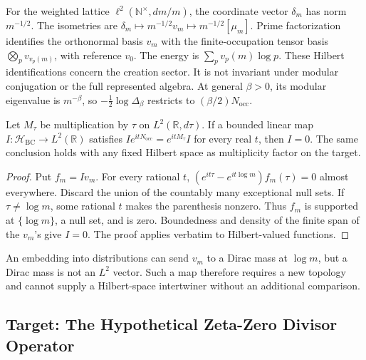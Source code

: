 \begin{remark}
\label{v4-arith:w9-r4:rem:bc-structure}
For the weighted lattice \(\ell^2(\mathbb N^\times,dm/m)\), the
coordinate vector \(\delta_m\) has norm \(m^{-1/2}\). The isometries are
\(\delta_m\mapsto m^{-1/2}v_m\mapsto m^{-1/2}[\mu_m]\).
Prime factorization identifies the orthonormal basis \(v_m\) with the
finite-occupation tensor basis \(\bigotimes_p v_{v_p(m)}\), with
reference \(v_0\). The energy is \(\sum_p v_p(m)\log p\).
These Hilbert identifications concern the creation sector. It is not
invariant under modular conjugation or the full represented algebra.
At general \(\beta>0\), its modular eigenvalue is \(m^{-\beta}\),
so \(-\tfrac12\log\Delta_\beta\) restricts to
\((\beta/2)N_{\mathrm{occ}}\).
\end{remark}

\begin{proposition}
\label{v4-arith:w9-r4:atomic-continuous-obstruction}
Let \(M_\tau\) be multiplication by \(\tau\) on \(L^2(\mathbb R,d\tau)\).
If a bounded linear map \(I:\mathcal H_{\mathrm{BC}}\to L^2(\mathbb R)\)
satisfies \(I e^{itN_{\mathrm{occ}}}=e^{itM_\tau}I\) for every real
\(t\), then \(I=0\). The same conclusion holds with any fixed Hilbert
space as multiplicity factor on the target.
\end{proposition}
\begin{proof}
Put \(f_m=Iv_m\). For every rational \(t\),
\((e^{it\tau}-e^{it\log m})f_m(\tau)=0\) almost everywhere.
Discard the union of the countably many exceptional null sets. If
\(\tau\ne\log m\), some rational \(t\) makes the parenthesis nonzero.
Thus \(f_m\) is supported at \(\{\log m\}\), a null set, and is zero.
Boundedness and density of the finite span of the \(v_m\)'s give
\(I=0\). The proof applies verbatim to Hilbert-valued functions.
\end{proof}

An embedding into distributions can send \(v_m\) to a Dirac mass at
\(\log m\), but a Dirac mass is not an \(L^2\) vector. Such a map
therefore requires a new topology and cannot supply a Hilbert-space
intertwiner without an additional comparison.

\subsection{Target: The Hypothetical Zeta-Zero Divisor Operator}
\label{v4-arith:w9-r4:setup:target}

